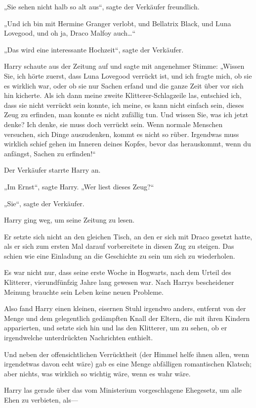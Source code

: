{„Sie sehen nicht halb so alt aus“, sagte der Verkäufer freundlich.

„Und ich bin mit Hermine Granger verlobt, und Bellatrix Black, und Luna Lovegood, und oh ja, Draco Malfoy auch…“

„Das wird eine interessante Hochzeit“, sagte der Verkäufer.

Harry schaute aus der Zeitung auf und sagte mit angenehmer Stimme: „Wissen Sie, ich hörte zuerst, dass Luna Lovegood verrückt ist, und ich fragte mich, ob sie es wirklich war, oder ob sie nur Sachen erfand und die ganze Zeit über vor sich hin kicherte. Als ich dann meine zweite Klitterer-Schlagzeile las, entschied ich, dass sie nicht verrückt sein konnte, ich meine, es kann nicht einfach sein, dieses Zeug zu erfinden, man konnte es nicht zufällig tun. Und wissen Sie, was ich jetzt denke? Ich denke, sie muss doch verrückt sein. Wenn normale Menschen versuchen, sich Dinge auszudenken, kommt es nicht so rüber. Irgendwas muss wirklich schief gehen im Inneren deines Kopfes, bevor das herauskommt, wenn du anfängst, Sachen zu erfinden!“

Der Verkäufer starrte Harry an.

„Im Ernst“, sagte Harry. „Wer liest dieses Zeug?“

„Sie“, sagte der Verkäufer.

Harry ging weg, um seine Zeitung zu lesen.

Er setzte sich nicht an den gleichen Tisch, an den er sich mit Draco gesetzt hatte, als er sich zum ersten Mal darauf vorbereitete in diesen Zug zu steigen. Das schien wie eine Einladung an die Geschichte zu sein um sich zu wiederholen.

Es war nicht nur, dass seine erste Woche in Hogwarts, nach dem Urteil des Klitterer, vierundfünfzig Jahre lang gewesen war. Nach Harrys bescheidener Meinung brauchte sein Leben keine neuen Probleme.

Also fand Harry einen kleinen, eisernen Stuhl irgendwo anders, entfernt von der Menge und dem gelegentlich gedämpften Knall der Eltern, die mit ihren Kindern apparierten, und setzte sich hin und las den Klitterer, um zu sehen, ob er irgendwelche unterdrückten Nachrichten enthielt.

Und neben der offensichtlichen Verrücktheit (der Himmel helfe ihnen allen, wenn irgendetwas davon echt wäre) gab es eine Menge abfälligen romantischen Klatsch; aber nichts, was wirklich so wichtig wäre, wenn es wahr wäre.

Harry las gerade über das vom Ministerium vorgeschlagene Ehegesetz, um alle Ehen zu verbieten, als—

}
